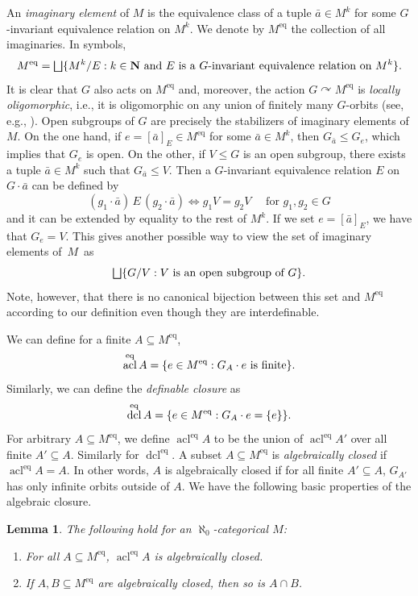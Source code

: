 \documentclass[11pt]{article}
\newcommand{\ie}{i.e.,\xspace}
\providecommand{\And}{}\numberwithin{equation}{section}
\let\oldbigsqcup\bigsqcup
\renewcommand{\bigsqcup}{\mathop{\textstyle\oldbigsqcup}\displaylimits}
\let\actson\curvearrowright
\let\sub\subseteq
\theoremstyle{plain}
\newtheorem{lemma}[theorem]{Lemma}
\theoremstyle{definition}
\newcommand{\N}{{\mathbf N}}
\DeclareMathOperator{\acl}{acl}
\DeclareMathOperator{\dcl}{dcl}
\DeclarePairedDelimiter\set{\{}{\}}
\newcommand{\eq}{^{\mathrm{eq}}}
\renewcommand{\And}{\text{ and }}
\newcommand{\eqrel}[1]{\,#1\,}
\begin{document}
An \emph{imaginary element} of $M$ is the equivalence class of a tuple $\bar a \in M^k$ for some $G$-invariant equivalence relation on $M^k$. We denote by $M\eq$ the collection of all imaginaries. In symbols,
\begin{equation*}
M\eq = \bigsqcup \set{M^k / E : k \in \N \And E \text{ is a $G$-invariant equivalence relation on } M^k}.
\end{equation*}
It is clear that $G$ also acts on $M\eq$ and, moreover, the action $G \actson M\eq$ is \emph{locally oligomorphic}, \ie it is oligomorphic on any union of finitely many $G$-orbits (see, e.g., \cite[Th.\,2.4]{Tsankov2012}). Open subgroups of $G$ are precisely the stabilizers of imaginary elements of $M$. On the one hand, if $e = [\bar a]_E \in M\eq$ for some $\bar a \in M^k$, then $G_{\bar a} \leq G_e$, which implies that $G_e$ is open. On the other, if $V \leq G$ is an open subgroup, there exists a tuple $\bar a \in M^k$ such that $G_{\bar a} \leq V$. Then a $G$-invariant equivalence relation $E$ on $G \cdot \bar a$ can be defined by
\begin{equation}
\label{eq:def-imaginary-eqrel}
(g_1 \cdot \bar a) \eqrel{E} (g_2 \cdot \bar a) \iff g_1V = g_2V \quad \text{ for } g_1, g_2 \in G
\end{equation}
and it can be extended by equality to the rest of $M^k$. If we set $e = [\bar a]_E$, we have that $G_e = V$. This gives another possible way to view the set of imaginary elements of~$M$~as
\begin{equation*}
\bigsqcup \set{G/V : V \text{ is an open subgroup of } G}.
\end{equation*}
Note, however, that there is no canonical bijection between this set and $M\eq$ according to our definition even though they are interdefinable.

We can define for a finite $A \sub M\eq$,
\begin{equation*}
\acl\eq A = \set{e \in M\eq : G_A \cdot e \text{ is finite}}.
\end{equation*}
Similarly, we can define the \emph{definable closure} as
\begin{equation*}
\dcl\eq A = \set{e \in M\eq : G_A \cdot e = \set{e}}.
\end{equation*}
For arbitrary $A \sub M\eq$, we define $\acl\eq A$ to be the union of $\acl\eq A'$ over all finite $A' \sub A$. Similarly for $\dcl\eq$. A subset $A \sub M\eq$ is \emph{algebraically closed} if $\acl\eq A = A$. In other words, $A$ is algebraically closed if for all finite $A' \sub A$, $G_{A'}$ has only infinite orbits outside of $A$.
We have the following basic properties of the algebraic closure.
\begin{lemma}
\label{l:acl}
The following hold for an $\aleph_0$-categorical $M$:
\begin{enumerate}
\item \label{i:acl:1} For all $A \sub M\eq$, $\acl\eq A$ is algebraically closed.
\item \label{i:acl:2} If $A, B \sub M\eq$ are algebraically closed, then so is $A \cap B$.
\end{enumerate}
\end{lemma}
\end{document}
